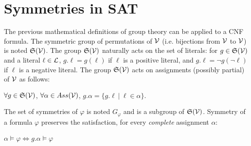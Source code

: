\section{Symmetries in SAT}
The previous mathematical definitions of group theory can be applied to a CNF formula.
The symmetric group of permutations of $\mathcal{V}$ (i.e. bijections from $\mathcal{V}$ to $\mathcal{V}$) is noted
$\mathfrak{S}(\mathcal{V})$. The group $\mathfrak{S}(\mathcal{V})$ naturally acts on the set of literals: for $g
\in \mathfrak{S}(\mathcal{V})$ and a literal $\ell \in \mathcal{L} $, $g.\ell = g(\ell)$ if $\ell$ is a
positive literal, and $g.\ell = \neg g(\neg \ell)$ if $\ell$ is a negative literal.
The group $\mathfrak{S}(\mathcal{V})$ acts on  assignments (possibly partial) of $\mathcal{V}$ as follows: 
\begin{center}
 $\forall g \in \mathfrak{S}(\mathcal{V})$, $ \forall \alpha \in Ass(\mathcal{V})$, $g.\alpha = \{ g.\ell ~|~ \ell \in \alpha \}$.
\end{center}
The set of symmetries of $\varphi$ is noted $G_{\varphi}$ and is a subgroup of $\mathfrak{S}(\mathcal{V})$.
Symmetry of a formula $\varphi$ preserves the satisfaction, for every \emph{complete} assignment $\alpha$:
\begin{center}
 $\alpha \models \varphi\Leftrightarrow g.\alpha \models \varphi$
\end{center}
% 

